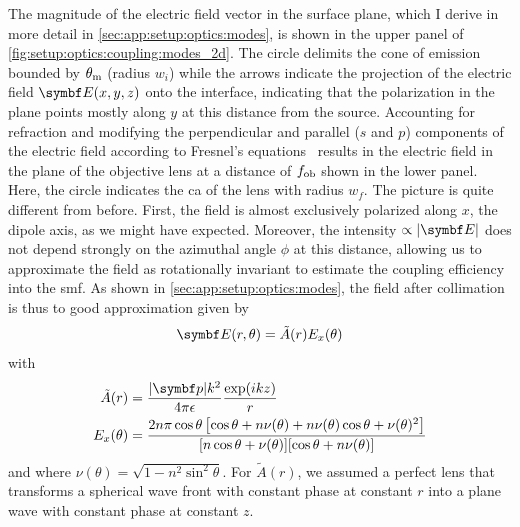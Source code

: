 The magnitude of the electric field vector in the surface plane, which I derive in more detail in \cref{sec:app:setup:optics:modes}, is shown in the upper panel of \cref{fig:setup:optics:coupling:modes_2d}.
The circle delimits the cone of emission bounded by $\theta_{\mathrm{m}}$ (radius $w_i$) while the arrows indicate the projection of the electric field $\bvec{E}(x, y, z)$ onto the interface, indicating that the polarization in the plane points mostly along $y$ at this distance from the source.
Accounting for refraction and modifying the perpendicular and parallel ($s$ and $p$) components of the electric field according to Fresnel's equations~\cite{Hecht2017} results in the electric field in the plane of the objective lens at a distance of $f_{\mathrm{ob}}$ shown in the lower panel.
Here, the circle indicates the \gls{ca} of the lens with radius $w_f$.
The picture is quite different from before.
First, the field is almost exclusively polarized along $x$, the dipole axis, as we might have expected.
Moreover, the intensity $\propto\abs{\bvec{E}}$ does not depend strongly on the azimuthal angle $\phi$ at this distance, allowing us to approximate the field as rotationally invariant to estimate the coupling efficiency into the \gls{smf}.
As shown in \cref{sec:app:setup:optics:modes}, the field after collimation is thus to good approximation given by
\begin{equation}\label{eq:setup:optics:coupling:efield:lens}
    \bvec{E}(r, \theta) = \tilde{A}(r)E_x(\theta)
\end{equation}
with
\begin{align}
    \tilde{A}(r) &= \frac{\abs{\bvec{p}}k^2}{4\pi\epsilon}\frac{\exp(\i k z)}{r} \\
    E_x(\theta) &= \frac{2n\pi\cos\theta\left[\cos\theta + n\nu(\theta) + n\nu(\theta)\cos\theta + \nu(\theta)^2\right]}{[n\cos\theta + \nu(\theta)][\cos\theta + n\nu(\theta)]} \label{eq:setup:optics:coupling:efield:lens:x}
\end{align}
and where $\nu(\theta) = \sqrt{1 - n^2\sin^2\theta}$.
For $\tilde{A}(r)$, we assumed a perfect lens that transforms a spherical wave front with constant phase at constant $r$ into a plane wave with constant phase at constant $z$.

